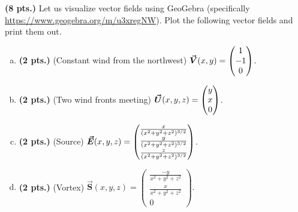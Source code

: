 \documentclass[12pt]{article} %
\begin{document}
\newpage
\begin{problem}
\textbf{(8 pts.)} Let us visualize vector fields using GeoGebra (specifically \url{https://www.geogebra.org/m/u3xregNW}). Plot the following vector fields and print them out.
\begin{enumerate}[(a)]
    \item \textbf{(2 pts.)} (Constant wind from the northwest) $\boldsymbol{\vec{V}}(x,y)=\begin{pmatrix} 1 \\ -1 \\ 0\end{pmatrix}$.
    \item \textbf{(2 pts.)} (Two wind fronts meeting) $\boldsymbol{\vec{U}}(x,y,z)=\begin{pmatrix} y \\ x \\ 0 \end{pmatrix}$.
    \item \textbf{(2 pts.)} (Source) $\boldsymbol{\vec{E}}(x,y,z) = \begin{pmatrix} \frac{x}{(x^2+y^2+z^2)^{3/2}} \\ \frac{y}{(x^2+y^2+z^2)^{3/2}} \\ \frac{z}{(x^2+y^2+z^2)^{3/2}} \end{pmatrix}$.
    \item \textbf{(2 pts.)} (Vortex) $\boldsymbol{\vec{S}}(x,y,z)=\begin{pmatrix} \frac{-y}{x^2+y^2+z^2} \\ \frac{x}{x^2+y^2+z^2} \\ 0\end{pmatrix}.$
\end{enumerate}
\end{problem}
\end{document}
